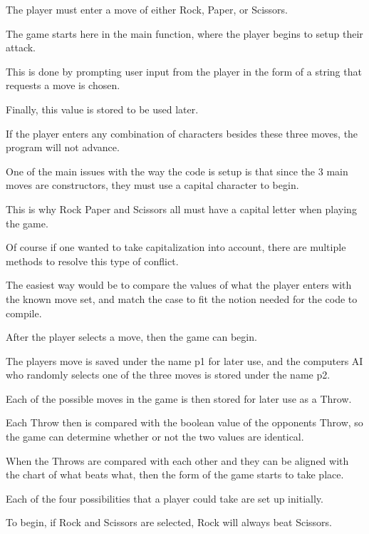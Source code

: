 \documentclass{article}
\begin{document}
\medskip\noindent
The player must enter a move of either Rock, Paper, or Scissors.

\medskip\noindent
The game starts here in the main function, where the player begins to setup their attack.

\medskip\noindent
This is done by prompting user input from the player in the form of a string that requests a move is chosen. 

\medskip\noindent
Finally, this value is stored to be used later.

\medskip\noindent
If the player enters any combination of characters besides these three moves, the program will not advance. 

\medskip\noindent
One of the main issues with the way the code is setup is that since the 3 main moves are constructors, they must use a capital character to begin. 

\medskip\noindent
This is why Rock Paper and Scissors all must have a capital letter when playing the game.

\medskip\noindent
Of course if one wanted to take capitalization into account, there are multiple methods to resolve this type of conflict. 

\medskip\noindent
The easiest way would be to compare the values of what the player enters with the known move set, and match the case to fit the notion needed for the code to compile. 

\medskip\noindent
After the player selects a move, then the game can begin.

\medskip\noindent
The players move is saved under the name p1 for later use, and the computers AI who randomly selects one of the three moves is stored under the name p2.

\medskip\noindent
Each of the possible moves in the game is then stored for later use as a Throw. 

\medskip\noindent
Each Throw then is compared with the boolean value of the opponents Throw, so the game can determine whether or not the two values are identical. 

\medskip\noindent
When the Throws are compared with each other and they can be aligned with the chart of what beats what, then the form of the game starts to take place.

\medskip\noindent
Each of the four possibilities that a player could take are set up initially.

\medskip\noindent
To begin, if Rock and Scissors are selected, Rock will always beat Scissors.
\end{document}
